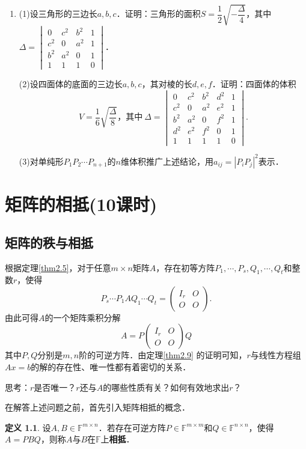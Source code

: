 \documentclass[a4paper,fontset=windows]{ctexbook}
\theoremstyle{definition}
\newtheorem{definition}{定义}[chapter]
\def\note{\noindent\raisebox{10pt}{\dbend}\hspace{7pt}}
\begin{document}
\begin{enumerate}
\item (1)设三角形的三边长$a,b,c$．证明：三角形的面积$S=\dfrac{1}{2}\sqrt{-\dfrac{\Delta}{4}}$，其中$\Delta=\begin{vmatrix}0&c^2&b^2&1 \\ c^2&0&a^2&1 \\ b^2&a^2&0&1 \\ 1&1&1&0 \end{vmatrix}$．

(2)设四面体的底面的三边长$a,b,c$，其对棱的长$d,e,f$．证明：四面体的体积
$$V=\frac{1}{6}\sqrt{\frac{\Delta}{8}}\text{，其中}~\Delta=\begin{vmatrix}0&c^2&b^2&d^2&1 \\ c^2&0&a^2&e^2&1 \\ b^2&a^2&0&f^2&1 \\ d^2&e^2&f^2&0&1 \\ 1&1&1&1&0\end{vmatrix}.$$

(3)对单纯形$P_1P_2\cdots P_{n+1}$的$n$维体积推广上述结论，用$a_{ij}=|P_iP_j|^2$表示．
\end{enumerate}

\chapter{矩阵的相抵(10课时)}%

\section{矩阵的秩与相抵}

根据定理\ref{thm2.5}，对于任意$m\times n$矩阵$A$，存在初等方阵$P_1,\cdots,P_s,Q_1,\cdots,Q_t$和整数$r$，使得
$$P_s\cdots P_1AQ_1\cdots Q_t=\begin{pmatrix}I_r&O \\ O&O\end{pmatrix}.$$
由此可得$A$的一个矩阵乘积分解
$$A=P\begin{pmatrix}I_r&O \\ O&O\end{pmatrix}Q$$
其中$P,Q$分别是$m,n$阶的可逆方阵．由定理\ref{thm2.9} 的证明可知，$r$与线性方程组$Ax=b$的解的存在性、唯一性都有着密切的关系．

\note 思考：$r$是否唯一？$r$还与$A$的哪些性质有关？如何有效地求出$r$？

\medskip 在解答上述问题之前，首先引入矩阵相抵的概念．

\begin{definition}\label{def4.1}
设$A,B\in\mathbb{F}^{m\times n}$．若存在可逆方阵$P\in\mathbb{F}^{m\times m}$和$Q\in\mathbb{F}^{n\times n}$，使得$A=PBQ$，则称$A$与$B$在$\mathbb{F}$上{\bf 相抵}．
\end{definition}
\end{document}
